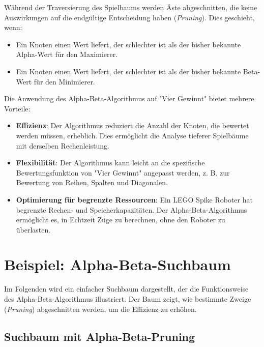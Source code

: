 Während der Traversierung des Spielbaums werden Äste abgeschnitten, die keine Auswirkungen auf die endgültige Entscheidung haben (\textit{Pruning}). Dies geschieht, wenn:
\begin{itemize}
	\item Ein Knoten einen Wert liefert, der schlechter ist als der bisher bekannte Alpha-Wert für den Maximierer.
	\item Ein Knoten einen Wert liefert, der schlechter ist als der bisher bekannte Beta-Wert für den Minimierer.
\end{itemize}

Die Anwendung des Alpha-Beta-Algorithmus auf "Vier Gewinnt" bietet mehrere Vorteile:
\begin{itemize}
	\item \textbf{Effizienz}: Der Algorithmus reduziert die Anzahl der Knoten, die bewertet werden müssen, erheblich. Dies ermöglicht die Analyse tieferer Spielbäume mit derselben Rechenleistung.
	\item \textbf{Flexibilität}: Der Algorithmus kann leicht an die spezifische Bewertungsfunktion von "Vier Gewinnt" angepasst werden, z. B. zur Bewertung von Reihen, Spalten und Diagonalen.
	\item \textbf{Optimierung für begrenzte Ressourcen}: Ein LEGO Spike Roboter hat begrenzte Rechen- und Speicherkapazitäten. Der Alpha-Beta-Algorithmus ermöglicht es, in Echtzeit Züge zu berechnen, ohne den Roboter zu überlasten.
\end{itemize}

\section*{Beispiel: Alpha-Beta-Suchbaum}

Im Folgenden wird ein einfacher Suchbaum dargestellt, der die Funktionsweise des Alpha-Beta-Algorithmus illustriert. Der Baum zeigt, wie bestimmte Zweige (\textit{Pruning}) abgeschnitten werden, um die Effizienz zu erhöhen.

\subsection*{Suchbaum mit Alpha-Beta-Pruning}

